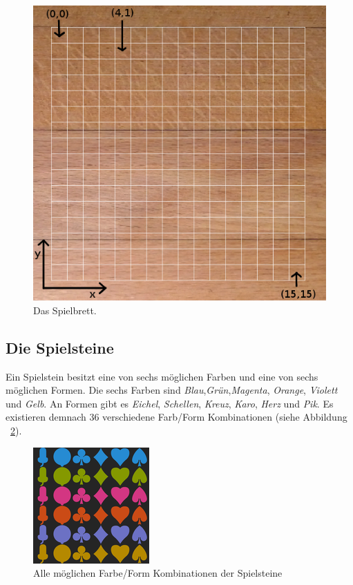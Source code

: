 \documentclass[a4paper, ngerman]{scrartcl}
\begin{document}
\begin{figure}[h] \centering 
	\includegraphics[scale = 0.3]{images/Spielbrett}
	\caption{Das Spielbrett.}
	\label{fig:Spielfeld}
\end{figure}

\subsection{Die Spielsteine}
Ein Spielstein besitzt eine von sechs möglichen Farben und eine von sechs möglichen Formen. Die sechs Farben sind \emph{Blau},\emph{Grün},\emph{Magenta}, \emph{Orange}, \emph{Violett} und \emph{Gelb}. An Formen gibt es \emph{Eichel}, \emph{Schellen}, \emph{Kreuz}, \emph{Karo}, \emph{Herz} und \emph{Pik}.  Es existieren demnach 36 verschiedene Farb/Form Kombinationen (siehe Abbildung ~\ref{fig:Spielsteine}).\\

\begin{figure}[h] \centering 
	\includegraphics[scale = 0.8]{images/Spielsteine}
	\caption{Alle möglichen Farbe/Form Kombinationen der Spielsteine}
	\label{fig:Spielsteine}
\end{figure}
\end{document}
